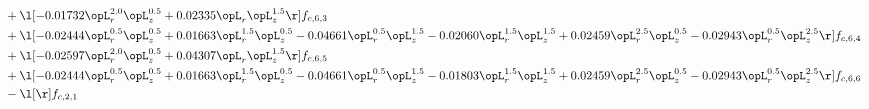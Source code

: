 \begin{alignat}{2}
& + \l[  -0.01732 \opL_r^{2.0} \opL_z^{0.5} +  0.02335 \opL_r \opL_z^{1.5}  \r] f_{c,6,3} \nonumber \\ 
& + \l[  -0.02444 \opL_r^{0.5} \opL_z^{0.5} +  0.01663 \opL_r^{1.5} \opL_z^{0.5}   -0.04661 \opL_r^{0.5} \opL_z^{1.5}   -0.02060 \opL_r^{1.5} \opL_z^{1.5} +  0.02459 \opL_r^{2.5} \opL_z^{0.5}   -0.02943 \opL_r^{0.5} \opL_z^{2.5}  \r] f_{c,6,4} \nonumber \\ 
& + \l[  -0.02597 \opL_r^{2.0} \opL_z^{0.5} +  0.04307 \opL_r \opL_z^{1.5}  \r] f_{c,6,5} \nonumber \\ 
& + \l[  -0.02444 \opL_r^{0.5} \opL_z^{0.5} +  0.01663 \opL_r^{1.5} \opL_z^{0.5}   -0.04661 \opL_r^{0.5} \opL_z^{1.5}   -0.01803 \opL_r^{1.5} \opL_z^{1.5} +  0.02459 \opL_r^{2.5} \opL_z^{0.5}   -0.02943 \opL_r^{0.5} \opL_z^{2.5}  \r] f_{c,6,6} \nonumber \\ 
& - \l[  \r] f_{c,2,1} \nonumber \\ 
\end{alignat} 


